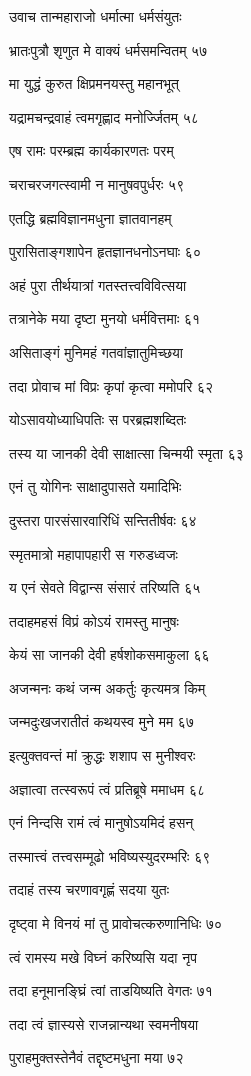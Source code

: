 उवाच तान्महाराजो धर्मात्मा धर्मसंयुतः

भ्रातःपुत्रौ शृणुत मे वाक्यं धर्मसमन्वितम् ५७

मा युद्धं कुरुत क्षिप्रमनयस्तु महानभूत्

यद्रामचन्द्रवाहं त्वमगृह्णाद मनोर्ज्जितम् ५८

एष रामः परम्ब्रह्म कार्यकारणतः परम्

चराचरजगत्स्वामी न मानुषवपुर्धरः ५९

एतद्धि ब्रह्मविज्ञानमधुना ज्ञातवानहम्

पुरासिताङ्गशापेन हृतज्ञानधनोऽनघाः ६०

अहं पुरा तीर्थयात्रां गतस्तत्त्वविवित्सया

तत्रानेके मया दृष्टा मुनयो धर्मवित्तमाः ६१

असिताङ्गं मुनिमहं गतवांज्ञातुमिच्छया

तदा प्रोवाच मां विप्रः कृपां कृत्वा ममोपरि ६२

योऽसावयोध्याधिपतिः स परब्रह्मशब्दितः

तस्य या जानकी देवी साक्षात्सा चिन्मयी स्मृता ६३

एनं तु योगिनः साक्षादुपासते यमादिभिः

दुस्तरा पारसंसारवारिधिं सन्तितीर्षवः ६४

स्मृतमात्रो महापापहारी स गरुडध्वजः

य एनं सेवते विद्वान्स संसारं तरिष्यति ६५

तदाहमहसं विप्रं कोऽयं रामस्तु मानुषः

केयं सा जानकी देवी हर्षशोकसमाकुला ६६

अजन्मनः कथं जन्म अकर्तुः कृत्यमत्र किम्

जन्मदुःखजरातीतं कथयस्व मुने मम ६७

इत्युक्तवन्तं मां क्रुद्धः शशाप स मुनीश्वरः

अज्ञात्वा तत्स्वरूपं त्वं प्रतिब्रूषे ममाधम ६८

एनं निन्दसि रामं त्वं मानुषोऽयमिदं हसन्

तस्मात्त्वं तत्त्वसम्मूढो भविष्यस्युदरम्भरिः ६९

तदाहं तस्य चरणावगृह्णं सदया युतः

दृष्ट्वा मे विनयं मां तु प्रावोचत्करुणानिधिः ७०

त्वं रामस्य मखे विघ्नं करिष्यसि यदा नृप

तदा हनूमानङ्घ्रिं त्वां ताडयिष्यति वेगतः ७१

तदा त्वं ज्ञास्यसे राजन्नान्यथा स्वमनीषया

पुराहमुक्तस्तेनैवं तद्दृष्टमधुना मया ७२

